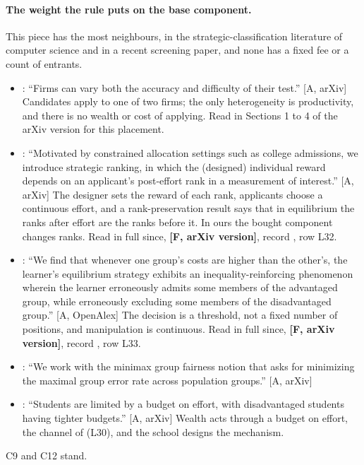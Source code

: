 \documentclass[11pt,a4paper]{article}
\newcommand{\aq}[2]{``#2''}
\begin{document}
\paragraph{The weight the rule puts on the base component.} This piece has
the most neighbours, in the strategic-classification literature of computer
science and in a recent screening paper, and none has a fixed fee or a count
of entrants.
\begin{itemize}
\item \citet{Hancart2026}: \aq{Hancart2026}{Firms can vary both the accuracy and difficulty of their test.} [A, arXiv] Candidates apply to one of two
  firms; the only heterogeneity is productivity, and there is no wealth or
  cost of applying. Read in Sections 1 to 4 of the arXiv version for this
  placement.
\item \citet{LiuGargBorgs2022}: \aq{LiuGargBorgs2022}{Motivated by constrained allocation settings such as college admissions, we introduce strategic ranking, in which the (designed) individual reward depends on an applicant's post-effort rank in a measurement of interest.} [A, arXiv] The designer sets the
  reward of each rank, applicants choose a continuous effort, and a
  rank-preservation result says that in equilibrium the ranks after effort
  are the ranks before it. In ours the bought component changes ranks. Read
  in full since, \textbf{[F, arXiv version]}, record
  , row L32.
\item \citet{HuImmorlicaVaughan2019}: \aq{HuImmorlicaVaughan2019}{We find that whenever one group's costs are higher than the other's, the learner's equilibrium strategy exhibits an inequality-reinforcing phenomenon wherein the learner erroneously admits some members of the advantaged group, while erroneously excluding some members of the disadvantaged group.} [A, OpenAlex] The decision
  is a threshold, not a fixed number of positions, and manipulation is
  continuous. Read in full since, \textbf{[F, arXiv version]}, record
  , row L33.
\item \citet{DianaSharifiMalvajerdiVakilian2024}: \aq{DianaSharifiMalvajerdiVakilian2024}{We work with the minimax group fairness notion that asks for minimizing the maximal group error rate across population groups.} [A, arXiv]
\item \citet{BeyhaghiCamaraHartlineJohnsenLong2023}: \aq{BeyhaghiCamaraHartlineJohnsenLong2023}{Students are limited by a budget on effort, with disadvantaged students having tighter budgets.} [A, arXiv]
  Wealth acts through a budget on effort, the channel of
  \citet{FernandezGali1999} (L30), and the school designs the mechanism.
\end{itemize}
C9 and C12 stand.
\end{document}
